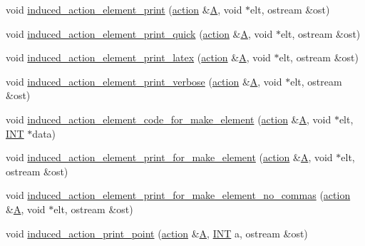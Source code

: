 \begin{DoxyCompactItemize}
\item 
void \mbox{\hyperlink{interface_8_c_a670952bd230bf34b82f276deab684d23}{induced\+\_\+action\+\_\+element\+\_\+print}} (\mbox{\hyperlink{classaction}{action}} \&\mbox{\hyperlink{simeon_8_c_a97833f04c3a9c008df5521a2fc291bb4}{A}}, void $\ast$elt, ostream \&ost)
\item 
void \mbox{\hyperlink{interface_8_c_a91760d711eca781aa4dbee22a5fc0168}{induced\+\_\+action\+\_\+element\+\_\+print\+\_\+quick}} (\mbox{\hyperlink{classaction}{action}} \&\mbox{\hyperlink{simeon_8_c_a97833f04c3a9c008df5521a2fc291bb4}{A}}, void $\ast$elt, ostream \&ost)
\item 
void \mbox{\hyperlink{interface_8_c_a962508fbbbac127426c42fe5d0f147ab}{induced\+\_\+action\+\_\+element\+\_\+print\+\_\+latex}} (\mbox{\hyperlink{classaction}{action}} \&\mbox{\hyperlink{simeon_8_c_a97833f04c3a9c008df5521a2fc291bb4}{A}}, void $\ast$elt, ostream \&ost)
\item 
void \mbox{\hyperlink{interface_8_c_a647a452eeefdaed4834375175fec37fc}{induced\+\_\+action\+\_\+element\+\_\+print\+\_\+verbose}} (\mbox{\hyperlink{classaction}{action}} \&\mbox{\hyperlink{simeon_8_c_a97833f04c3a9c008df5521a2fc291bb4}{A}}, void $\ast$elt, ostream \&ost)
\item 
void \mbox{\hyperlink{interface_8_c_af1c12dd980d376e72daaf9a383cebfdc}{induced\+\_\+action\+\_\+element\+\_\+code\+\_\+for\+\_\+make\+\_\+element}} (\mbox{\hyperlink{classaction}{action}} \&\mbox{\hyperlink{simeon_8_c_a97833f04c3a9c008df5521a2fc291bb4}{A}}, void $\ast$elt, \mbox{\hyperlink{galois_8h_a09fddde158a3a20bd2dcadb609de11dc}{I\+NT}} $\ast$data)
\item 
void \mbox{\hyperlink{interface_8_c_ad7e7ef951b164a7084837401e3dbc400}{induced\+\_\+action\+\_\+element\+\_\+print\+\_\+for\+\_\+make\+\_\+element}} (\mbox{\hyperlink{classaction}{action}} \&\mbox{\hyperlink{simeon_8_c_a97833f04c3a9c008df5521a2fc291bb4}{A}}, void $\ast$elt, ostream \&ost)
\item 
void \mbox{\hyperlink{interface_8_c_ae151544128a85b12466172340404b955}{induced\+\_\+action\+\_\+element\+\_\+print\+\_\+for\+\_\+make\+\_\+element\+\_\+no\+\_\+commas}} (\mbox{\hyperlink{classaction}{action}} \&\mbox{\hyperlink{simeon_8_c_a97833f04c3a9c008df5521a2fc291bb4}{A}}, void $\ast$elt, ostream \&ost)
\item 
void \mbox{\hyperlink{interface_8_c_af15373c64f9e8d33dd3c448d98cc2382}{induced\+\_\+action\+\_\+print\+\_\+point}} (\mbox{\hyperlink{classaction}{action}} \&\mbox{\hyperlink{simeon_8_c_a97833f04c3a9c008df5521a2fc291bb4}{A}}, \mbox{\hyperlink{galois_8h_a09fddde158a3a20bd2dcadb609de11dc}{I\+NT}} a, ostream \&ost)
\end{DoxyCompactItemize}


